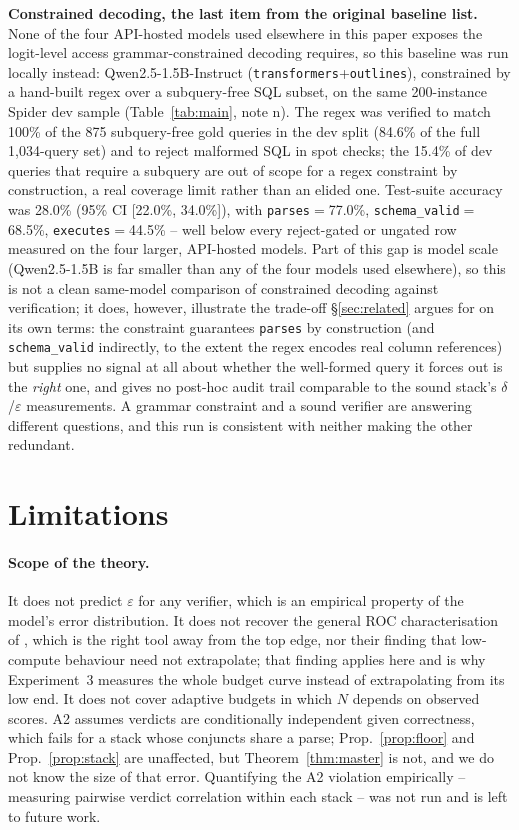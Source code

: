 \documentclass[11pt]{article}
\begin{document}
\textbf{Constrained decoding, the last item from the original baseline list.} None of the four API-hosted models used elsewhere in this paper exposes the logit-level access grammar-constrained decoding requires, so this baseline was run locally instead: Qwen2.5-1.5B-Instruct (\texttt{transformers}+\texttt{outlines}), constrained by a hand-built regex over a subquery-free SQL subset, on the same 200-instance Spider dev sample (Table~\ref{tab:main}, note n). The regex was verified to match 100\% of the 875 subquery-free gold queries in the dev split (84.6\% of the full 1{,}034-query set) and to reject malformed SQL in spot checks; the 15.4\% of dev queries that require a subquery are out of scope for a regex constraint by construction, a real coverage limit rather than an elided one. Test-suite accuracy was 28.0\% (95\% CI [22.0\%, 34.0\%]), with \texttt{parses}$=$77.0\%, \texttt{schema\_valid}$=$68.5\%, \texttt{executes}$=$44.5\% -- well below every reject-gated or ungated row measured on the four larger, API-hosted models. Part of this gap is model scale (Qwen2.5-1.5B is far smaller than any of the four models used elsewhere), so this is not a clean same-model comparison of constrained decoding against verification; it does, however, illustrate the trade-off \S\ref{sec:related} argues for on its own terms: the constraint guarantees \texttt{parses} by construction (and \texttt{schema\_valid} indirectly, to the extent the regex encodes real column references) but supplies no signal at all about whether the well-formed query it forces out is the \emph{right} one, and gives no post-hoc audit trail comparable to the sound stack's $\delta$/$\varepsilon$ measurements. A grammar constraint and a sound verifier are answering different questions, and this run is consistent with neither making the other redundant.

\section*{Limitations}
\paragraph{Scope of the theory.} It does not predict $\varepsilon$ for any verifier, which is an empirical property of the model's error distribution. It does not recover the general ROC characterisation of \citet{dorner2025rocnreroll}, which is the right tool away from the top edge, nor their finding that low-compute behaviour need not extrapolate; that finding applies here and is why Experiment~3 measures the whole budget curve instead of extrapolating from its low end. It does not cover adaptive budgets in which $N$ depends on observed scores. A2 assumes verdicts are conditionally independent given correctness, which fails for a stack whose conjuncts share a parse; Prop.~\ref{prop:floor} and Prop.~\ref{prop:stack} are unaffected, but Theorem~\ref{thm:master} is not, and we do not know the size of that error. Quantifying the A2 violation empirically -- measuring pairwise verdict correlation within each stack -- was not run and is left to future work.
\end{document}
